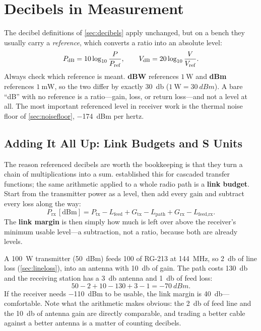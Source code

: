\section{Decibels in Measurement}
The decibel definitions of \cref{sec:decibels} apply unchanged, but on a bench they
usually carry a \emph{reference}, which converts a ratio into an absolute level:
\[
P_{\mathrm{dB}}=10\log_{10}\frac{P}{P_{\mathrm{ref}}},
\qquad
V_{\mathrm{dB}}=20\log_{10}\frac{V}{V_{\mathrm{ref}}}.
\]
Always check which reference is meant. \textbf{dBW} references \(\SI{1}{\watt}\) and
\textbf{dBm} references \(\SI{1}{\milli\watt}\), so the two differ by exactly
\SI{30}{\decibel} (\(\SI{1}{\watt}=\SI{30}{dBm}\)). A bare ``dB'' with no reference
is a ratio---gain, loss, or return loss---and not a level at all. The most important
referenced level in receiver work is the thermal noise floor of
\cref{sec:noisefloor}, \SI{-174}{dBm} per hertz.

\subsection{Adding It All Up: Link Budgets and S Units}
\label{sec:sunits}
The reason referenced decibels are worth the bookkeeping is that they turn a chain of
multiplications into a sum.  established this for cascaded
transfer functions; the same arithmetic applied to a whole radio path is a
\textbf{link budget}. Start from the transmitter power as a level, then add every gain
and subtract every loss along the way:
\[
P_{\text{rx}}\,[\mathrm{dBm}]
=P_{\text{tx}}-L_{\text{feed}}+G_{\text{tx}}
-L_{\text{path}}+G_{\text{rx}}-L_{\text{feed,rx}} .
\]
The \textbf{link margin} is then simply how much is left over above the receiver's
minimum usable level---a subtraction, not a ratio, because both are already levels.

\begin{workedbox}
A \SI{100}{\watt} transmitter (\SI{50}{dBm}) feeds \SI{100}{\foot} of RG-213 at
\SI{144}{\mega\hertz}, so \SI{2}{\decibel} of line loss (\cref{sec:lineloss}), into
an antenna with \SI{10}{\decibel} of gain. The path costs \SI{130}{\decibel} and the
receiving station has a \SI{3}{\decibel} antenna and \SI{1}{\decibel} of feed loss:
\[
50-2+10-130+3-1=\SI{-70}{dBm}.
\]
If the receiver needs \SI{-110}{dBm} to be usable, the link margin is
\SI{40}{\decibel}---comfortable. Note what the arithmetic makes obvious: the
\SI{2}{\decibel} of feed line and the \SI{10}{\decibel} of antenna gain are directly
comparable, and trading a better cable against a better antenna is a matter of
counting decibels.
\end{workedbox}

